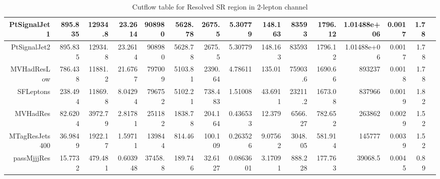 \begin{table}[ht!]
\begin{center}
{\begin{tabular}{ r ||  r  r  r  r  r  r  r  r  r  || r r r r r |}
PtSignalJet1 & 895.835 & 12934.8 & 23.2614 & 908980 & 5628.78 & 2675.5 & 5.30779 & 148.163 & 83593 & 1796.12 &1.01488e+06&0.0017 & 1.78\tabularnewline \hline
PtSignalJet2 & 895.835 & 12934.8 & 23.2614 & 908980 & 5628.78 & 2675.5 & 5.30779 & 148.163 & 83593 & 1796.12 &1.01488e+06&0.0017 & 1.78\tabularnewline \hline
MVHadResLow & 786.438 & 11881.2 & 21.6767 & 797009 & 5103.81 & 2390.64 & 4.78611 & 135.01 & 75903.6 & 1690.66&893237&0.0018 & 1.78\tabularnewline \hline
SFLeptons & 238.494 & 11869.8 & 8.04294 & 796752 & 5102.21 & 738.483 & 1.51008 & 43.6911 & 23211.2 & 1673.08&837966&0.0019 & 1.82\tabularnewline \hline
MVHadRes & 82.6204 & 3972.79 & 2.81781 & 251182 & 1838.78 & 204.164 & 0.436533 & 12.379 & 6566.27 & 782.652&263862&0.0029 & 1.52\tabularnewline \hline
MTagResJets400 & 36.9849 & 1922.17 & 1.59711 & 139844 & 814.46 & 100.109 & 0.263526 & 9.07562 & 3048.05 & 581.914&145777&0.0039 & 1.52\tabularnewline \hline
passMjjjRes & 15.7732 & 479.481 & 0.603948 & 37458.8 & 189.746 & 32.6127 & 0.0863601 & 3.17091 & 888.228 & 177.763&39068.5&0.0045 & 0.89\tabularnewline \hline
\end{tabular}
}
\caption{Cutflow table for Resolved SR region in 2-lepton channel}
\label{tab:2lep_ResolvedSR}
\end{center}
\end{table}




